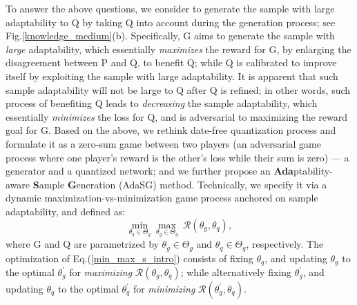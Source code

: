 To answer the above questions, we consider to generate the sample with large adaptability to Q by taking Q into account during the generation process; see Fig.\ref{knowledge_medium}(b).
Specifically, G aims to generate the sample with \emph{large} adaptability, which essentially \emph{maximizes} the reward for G, by enlarging the disagreement between P and Q, to benefit Q; while Q is calibrated to improve itself by exploiting the sample with large adaptability. It is apparent that such sample adaptability will not be large to Q after Q is refined; in other words, such process of benefiting Q leads to \emph{decreasing} the sample adaptability, which essentially \emph{minimizes} the loss for Q, and is adversarial to maximizing the reward goal for G. Based on the above, we rethink date-free quantization process and formulate it as a zero-sum game \cite{li2022policy,zhang2022no} between two players (an adversarial game process where one player's reward is the other's loss while their sum is zero) --- a generator and a quantized network; and we further propose an \textbf{Ada}ptability-aware \textbf{S}ample \textbf{G}eneration (AdaSG) method.
Technically, we specify it via a dynamic maximization-vs-minimization game process anchored on sample adaptability, and defined as:
\begin{equation}
\mathop{min}_{\theta_q\in \Theta_q} \mathop{max}_{\theta_g\in \Theta_g} \  \mathcal{R}(\theta_g,\theta_q),
\label{min_max_s_intro}
\end{equation}
where G and Q are parametrized by $\theta_g\in \Theta_g$ and $\theta_q\in \Theta_q$, respectively.
The optimization of Eq.(\ref{min_max_s_intro}) consists of  fixing $\theta_q$, and updating $\theta_g$ to the optimal $\theta_g^{'}$ for \textit{maximizing } $\mathcal{R}(\theta_g,\theta_q)$; while alternatively fixing $\theta_g^{'}$, and updating $\theta_q$ to the optimal $\theta_q^{'}$ for \textit{minimizing} $\mathcal{R}(\theta_g^{'},\theta_q)$.
